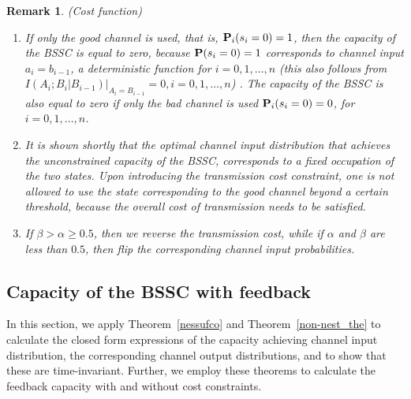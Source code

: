 \documentclass[11pt, a4paper, journal,onecolumn]{IEEEtran}
\newtheorem{remark}{Remark}[section]
\begin{document}
\begin{remark}(Cost function)
\label{rem-BSSC}
\begin{enumerate}
\item If only the good channel is used, that is, ${\bf P}_i(s_i=0)=1$, then the capacity of the  BSSC is equal to zero, because  ${\bf P}(s_i=0)=1$ corresponds to channel input $a_i=b_{i-1}$, a  deterministic function for $ i=0,1,\ldots, n$ (this also follows from $I(A_i; B_i|B_{i-1})\Big|_{A_i=B_{i-1}}=0, i=0,1, \ldots,n$) . The capacity of the  BSSC is also equal to zero if only the bad channel is used ${\bf P}_{i}(s_i=0)=0$, for $ i=0, 1, \ldots, n$.
\item It is shown shortly  that the optimal channel input distribution that achieves the unconstrained capacity of the BSSC, corresponds to  a fixed occupation  of the two states. Upon introducing the transmission cost constraint, one is not allowed to use the state corresponding to the good channel beyond a certain threshold, because the overall cost of  transmission needs to be satisfied.
\item If $\beta>\alpha\geq 0.5$, then we reverse the transmission cost, while if $\alpha$ and $\beta$ are less
than $0.5$, then  flip the corresponding channel input probabilities.
\end{enumerate}
\end{remark}


\subsection{Capacity of the BSSC with feedback}
In this section, we apply Theorem~\ref{nessufco} and Theorem~\ref{non-nest_the} to calculate the closed form expressions of the capacity achieving channel input distribution,  the corresponding channel output distributions, and to show that these are time-invariant. Further, we employ these theorems to calculate the feedback capacity with and without cost constraints. \\
\end{document}
